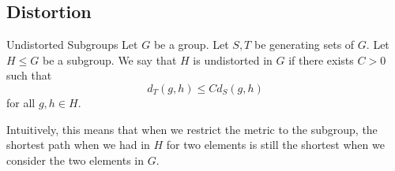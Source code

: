 \documentclass[a4paper]{article}
\begin{document}
\subsection{Distortion}
\begin{defn}{Undistorted Subgroups}{} Let $G$ be a group. Let $S,T$ be generating sets of $G$. Let $H\leq G$ be a subgroup. We say that $H$ is undistorted in $G$ if there exists $C>0$ such that $$d_T(g,h)\leq C d_S(g,h)$$ for all $g,h\in H$. 
\end{defn}

Intuitively, this means that when we restrict the metric to the subgroup, the shortest path when we had in $H$ for two elements is still the shortest when we consider the two elements in $G$. 
\end{document}

